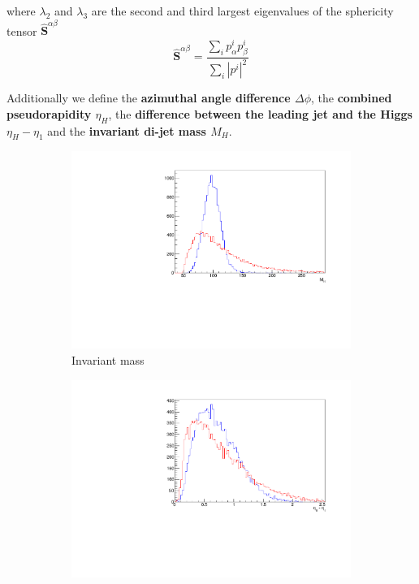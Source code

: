	where $\lambda_2$ and $\lambda_3$ are the second and third largest eigenvalues of the sphericity tensor $\mathbf{\hat{S}}^{\alpha\beta}$
	\begin{equation}
		\mathbf{\hat{S}}^{\alpha\beta} = \frac{\sum_i p_{\alpha}^i p_{\beta}^i}{\sum_i |p^i|^2}
	\end{equation}



Additionally we define the \textbf{azimuthal angle difference $ \Delta\phi $}, the \textbf{combined pseudorapidity $\eta_H$}, the \textbf{difference between the leading jet and the Higgs $\eta_H - \eta_1$} and the \textbf{invariant di-jet mass $M_H$}.




\begin{figure}[htbp]
	\centering	
	\begin{subfigure}[b]{0.25\textwidth}
	                \includegraphics[width=\textwidth]{img/mh}
	                \caption{Invariant mass}
	                \label{fig:mh}
	\end{subfigure}
	\begin{subfigure}[b]{0.25\textwidth}
	                \includegraphics[width=\textwidth]{img/angle}

\end{subfigure}
\end{figure}
